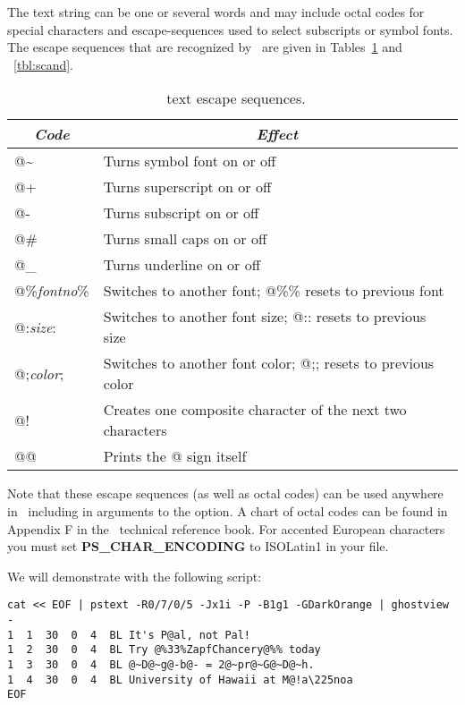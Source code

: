 \documentclass{report}
\begin{document}

The text string can be one or several words and may include octal codes for
special characters and escape-sequences used to select subscripts or symbol
fonts.  The escape sequences that are recognized by \GMT\ are given in Tables~\ref{tbl:escape}
and ~\ref{tbl:scand}.

\begin{table}[h]
\small
\centering
\begin{tabular}{|l|l|} \hline
\multicolumn{1}{|c|}{\emph{Code}}       &       \multicolumn{1}{c|}{\emph{Effect}} \\ \hline
@\~	&	Turns symbol font on or off \\ \hline 
@+	&	Turns superscript on or off \\ \hline 
@-	&	Turns subscript on or off \\ \hline 
@\#	&	Turns small caps on or off \\ \hline 
@\_	&	Turns underline on or off \\ \hline 
@\%\emph{fontno}\%	&	Switches to another font; @\%\% resets to previous font \\ \hline 
@:\emph{size}:	&	Switches to another font size; @:: resets to previous size \\ \hline 
@;\emph{color};	&	Switches to another font color; @;; resets to previous color \\ \hline 
@!	&	Creates one composite character of the next two characters \\ \hline 
@@	&	Prints the @ sign itself \\ \hline 
\end{tabular}
\caption{\gmt\ text escape sequences.}
\label{tbl:escape}
\end{table}

Note that these escape sequences (as well as octal codes) can be
used anywhere in \GMT\, including in arguments to the  option.
A chart of octal codes can be found in Appendix F in the \GMT\
technical reference book.  For accented European characters you must
set \textbf{PS\_CHAR\_ENCODING} to ISOLatin1 in your  file.

We will demonstrate  with the following script:

{\small\begin{verbatim} 
cat << EOF | pstext -R0/7/0/5 -Jx1i -P -B1g1 -GDarkOrange | ghostview -
1  1  30  0  4  BL It's P@al, not Pal!
1  2  30  0  4  BL Try @%33%ZapfChancery@%% today
1  3  30  0  4  BL @~D@~g@-b@- = 2@~pr@~G@~D@~h.
1  4  30  0  4  BL University of Hawaii at M@!a\225noa
EOF
\end{verbatim}
}
\end{document}
